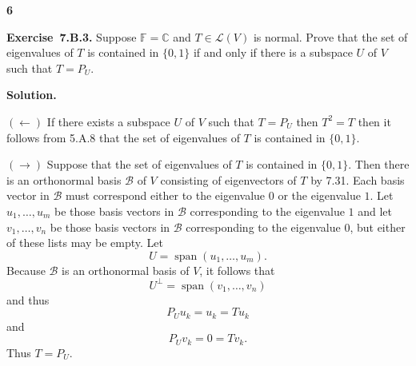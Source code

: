 \documentclass[11pt]{article}
\newcommand{\ProblemDivider}[1]{%
  \vspace{1.0em}
  \noindent\textbf{#1}\par
  \vspace{0.35em}
}
\newcommand{\ProblemAnnounce}{\noindent}
\newcommand{\SolutionAnnounce}{\noindent\textbf{Solution.}\par\medskip}
\newcommand{\Exercise}[1]{\textbf{Exercise~#1.}\;}
\newcommand{\C}{\mathbb{C}}
\newcommand{\F}{\mathbb{F}}
\newcommand{\LL}{\mathcal{L}}
\newcommand{\spann}{\operatorname{span}}
\begin{document}
\ProblemDivider{6}

\begin{problemBox}
\ProblemAnnounce
\Exercise{7.B.3}
Suppose $\F = \C$ and $T \in \LL(V)$ is normal. Prove that the set of eigenvalues of $T$ is contained in $\{0, 1\}$ if and only if there is a subspace $U$ of $V$ such that $T = P_U$.
\end{problemBox}

\begin{solutionBox}
\SolutionAnnounce
\doublespacing

$(\leftarrow)$ If there exists a subspace $U$ of $V$ such that $T = P_U$ then $T^2 = T$ then it follows from 5.A.8 that the set of eigenvalues of $T$ is contained in $\{0, 1\}$.

$(\rightarrow)$ Suppose that the set of eigenvalues of $T$ is contained in $\{0, 1\}$. Then there is an orthonormal basis $\mathcal{B}$ of $V$ consisting of eigenvectors of $T$ by 7.31. Each basis vector in $\mathcal{B}$ must correspond either to the eigenvalue $0$ or the eigenvalue $1$. Let $u_1, \dots, u_m$ be those basis vectors in $\mathcal{B}$ corresponding to the eigenvalue $1$ and let $v_1, \dots, v_n$ be those basis vectors in $\mathcal{B}$ corresponding to the eigenvalue $0$, but either of these lists may be empty. Let
\[
U = \spann(u_1, \dots, u_m).
\]
Because $\mathcal{B}$ is an orthonormal basis of $V$, it follows that
\[
U^\perp = \spann(v_1, \dots, v_n)
\]
and thus
\[
P_Uu_k = u_k = Tu_k
\]
and
\[
P_Uv_k = 0 = Tv_k.
\]
Thus $T = P_U$.

\end{solutionBox}
\end{document}
